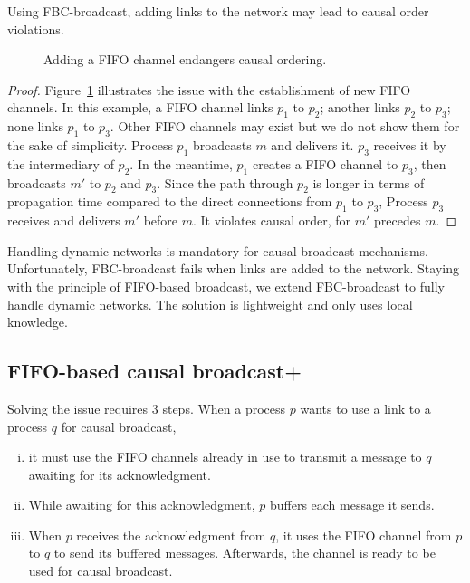 \begin{theorem}
  Using FBC-broadcast, adding links to the network may lead to causal order
  violations.
\end{theorem}

\begin{figure}
  \begin{center}
    
    \caption{\label{fig:problem}Adding a FIFO channel endangers causal
      ordering.}
  \end{center}
\end{figure}

\begin{proof}
  Figure~\ref{fig:problem} illustrates the issue with the establishment of new
  FIFO channels. In this example, a FIFO channel links $p_1$ to $p_2$; another
  links $p_2$ to $p_3$; none links $p_1$ to $p_3$. Other FIFO channels may exist
  but we do not show them for the sake of simplicity. Process $p_1$ broadcasts
  $m$ and delivers it. $p_3$ receives it by the intermediary of $p_2$. In the
  meantime, $p_1$ creates a FIFO channel to $p_3$, then broadcasts $m'$ to $p_2$
  and $p_3$. Since the path through $p_2$ is longer in terms of propagation time
  compared to the direct connections from $p_1$ to $p_3$, Process $p_3$ receives
  and delivers $m'$ before $m$. It violates causal order, for $m'$ precedes $m$.
\end{proof}

Handling dynamic networks is mandatory for causal broadcast
mechanisms. Unfortunately, FBC-broadcast fails when links are added to the
network. Staying with the principle of FIFO-based broadcast, we extend
FBC-broadcast to fully handle dynamic networks. The solution is lightweight and
only uses local knowledge.

\subsection{FIFO-based causal broadcast+}
\label{subsec:bufferbroadcast}

Solving the issue requires 3 steps. When a process $p$ wants to use a link to a
process $q$ for causal broadcast,
\begin{enumerate}[(i)]
\item it must use the FIFO channels already in use to transmit a message to $q$
  awaiting for its acknowledgment.
\item While awaiting for this acknowledgment, $p$ buffers each message it
  sends.
\item When $p$ receives the acknowledgment from $q$, it uses the FIFO channel
  from $p$ to $q$ to send its buffered messages. Afterwards, the channel is
  ready to be used for causal broadcast.
\end{enumerate}

